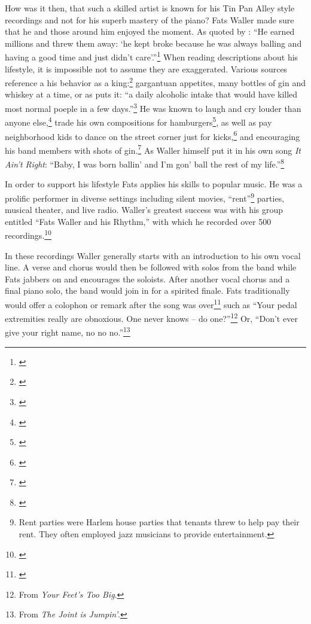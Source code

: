 \documentclass[11pt]{report}
\begin{document}
	\label{sec:thesis}
	How was it then, that such a skilled artist is known for his Tin Pan Alley style recordings and not for his superb mastery of the piano? Fats Waller made sure that he and those around him enjoyed the moment. As quoted by \citeauthor{jazz_scene}: ``He earned millions and threw them away: `he kept broke because he was always balling and having a good time and just didn't care'.''\footnote{\cite[208]{jazz_scene}} When reading descriptions about his lifestyle, it is impossible not to assume they are exaggerated. Various sources reference a his behavior as a king:\footnote{\cite[207]{jazz_scene}} gargantuan appetites, many bottles of gin and whiskey at a time, or as \citeauthor{life} puts it: ``a daily alcoholic intake that would have killed most normal poeple in a few days.''\footnote{\cite[2]{life}} He was known to laugh and cry louder than anyone else,\footnote{\cite[208]{jazz_scene}} trade his own compositions for hamburgers\footnote{\cite[144]{visions}}, as well as pay neighborhood kids to dance on the street corner just for kicks,\footnote{\cite[2]{life}} and encouraging his band members with shots of gin.\footnote{\cite[227]{anecdotes}} As Waller himself put it in his own song \emph{It Ain't Right}: ``Baby, I was born ballin' and I'm gon' ball the rest of my life.''\footnote{\cite[5]{outside-insider}}
	
	In order to support his lifestyle Fats applies his skills to popular music. He was a prolific performer in diverse settings including silent movies, ``rent''\footnote{Rent parties were Harlem house parties that tenants threw to help pay their rent. They often employed jazz musicians to provide entertainment.} parties, musical theater, and live radio. Waller's greatest success was with his group entitled ``Fats Waller and his Rhythm,'' with which he recorded over 500 recordings.\footnote{\cite[145]{visions}}
	
	In these recordings Waller generally starts with an introduction to his own vocal line. A verse and chorus would then be followed with solos from the band while Fats jabbers on and encourages the soloists. After another vocal chorus and a final piano solo, the band would join in for a spirited finale. Fats traditionally would offer a colophon or remark after the song was over\footnote{\cite[6]{outside-insider}} such as ``Your pedal extremities really are obnoxious. One never knows -- do one?''\footnote{From \emph{Your Feet's Too Big}.} Or, ``Don't ever give your right name, no no no.''\footnote{From \emph{The Joint is Jumpin'}.}
\end{document}
